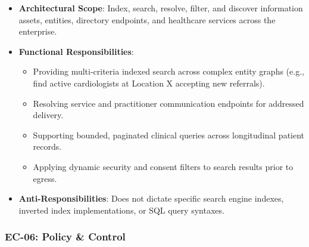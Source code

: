 \begin{itemize}

\item
\textbf{Architectural Scope}: Index, search, resolve, filter, and discover information assets, entities, directory endpoints, and healthcare services across the enterprise.



\item
\textbf{Functional Responsibilities}:


\begin{itemize}

\item
Providing multi-criteria indexed search across complex entity graphs (e.g., find active cardiologists at Location X accepting new referrals).



\item
Resolving service and practitioner communication endpoints for addressed delivery.



\item
Supporting bounded, paginated clinical queries across longitudinal patient records.



\item
Applying dynamic security and consent filters to search results prior to egress.



\end{itemize}


\item
\textbf{Anti-Responsibilities}: Does not dictate specific search engine indexes, inverted index implementations, or SQL query syntaxes.



\end{itemize}
\label{rad:enterprise:148}
\subsubsection*{EC-06: Policy \& Control}
\label{rad:enterprise:149}

